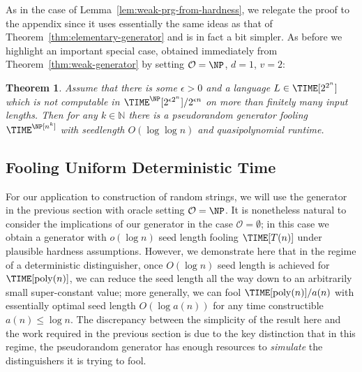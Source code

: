 \documentclass[11pt]{article}
\newtheorem{theorem}{Theorem}
\renewcommand{\poly}{\mathrm{poly}}
\begin{document}
As in the case of Lemma~\ref{lem:weak-prg-from-hardness}, we relegate the proof to the appendix since it uses essentially the same ideas as that of Theorem~\ref{thm:elementary-generator} and is in fact a bit simpler. As before we highlight an important special case, obtained immediately from Theorem~\ref{thm:weak-generator} by setting $\mathcal{O}= \NP$, $d=1$, $v = 2$:

\begin{theorem}\label{thm:weak-loglog-gen}
Assume that there is some $\epsilon > 0$ and a language $L \in \TIME[2^{2^n}]$ which is not computable in $\TIME^\NP[2^{\epsilon 2^n}]/2^{\epsilon n}$ on more than finitely many input lengths. Then for any $k \in \mathbb{N}$ there is a pseudorandom generator fooling $\TIME^\NP[n^k]$ with seedlength $O(\log \log n)$ and quasipolynomial runtime.
\end{theorem}

\subsection{Fooling Uniform Deterministic Time }\label{subsec:deterministic}

For our application to construction of random strings, we will use the generator in the previous section with oracle setting $\mathcal{O} = \NP$. It is nonetheless natural to consider the implications of our generator in the case $\mathcal{O} = \emptyset$; in this case we obtain a generator with $o(\log n)$ seed length fooling $\TIME[T(n)]$ under plausible hardness assumptions. However, we demonstrate here that in the regime of a deterministic distinguisher, once $O(\log n)$ seed length is achieved for $\TIME[\poly(n)]$, we can reduce the seed length all the way down to an arbitrarily small super-constant value; more generally, we can fool $\TIME[\poly(n)]/a(n)$ with essentially optimal seed length $O(\log a(n))$ for any time constructible $a(n) \leq \log n$. 
The discrepancy between the simplicity of the result here and the work required in the previous section is due to the key distinction that in this regime, the pseudorandom generator has enough resources to \emph{simulate} the distinguishers it is trying to fool.
\end{document}
